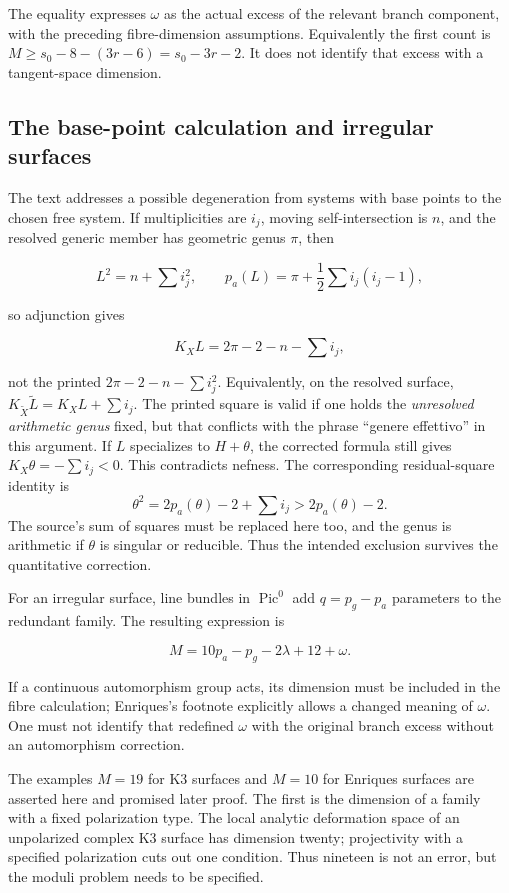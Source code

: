 The equality expresses \(\omega\) as the actual excess of the relevant branch component, with the preceding fibre-dimension assumptions. Equivalently the first count is \(M\ge s_0-8-(3r-6)=s_0-3r-2\). It does not identify that excess with a tangent-space dimension.

\subsection{The base-point calculation and irregular surfaces}

The text addresses a possible degeneration from systems with base points to the chosen free system. If multiplicities are \(i_j\), moving self-intersection is \(n\), and the resolved generic member has geometric genus \(\pi\), then

\[
L^2=n+\sum i_j^2,\qquad
p_a(L)=\pi+\frac12\sum i_j(i_j-1),
\]

so adjunction gives

\[
K_X L=2\pi-2-n-\sum i_j,
\]

not the printed \(2\pi-2-n-\sum i_j^2\). Equivalently, on the resolved surface, \(K_{\widetilde X}\widetilde L=K_X L+\sum i_j\). The printed square is valid if one holds the \emph{unresolved arithmetic genus} fixed, but that conflicts with the phrase ``genere effettivo'' in this argument. If \(L\) specializes to \(H+\theta\), the corrected formula still gives \(K_X\theta=-\sum i_j<0\). This contradicts nefness. The corresponding residual-square identity is \[
\theta^2=2p_a(\theta)-2+\sum i_j>2p_a(\theta)-2.
\] The source's sum of squares must be replaced here too, and the genus is arithmetic if \(\theta\) is singular or reducible. Thus the intended exclusion survives the quantitative correction.

For an irregular surface, line bundles in \(\operatorname{Pic}^0\) add \(q=p_g-p_a\) parameters to the redundant family. The resulting expression is

\[
M=10p_a-p_g-2\lambda+12+\omega.
\]

If a continuous automorphism group acts, its dimension must be included in the fibre calculation; Enriques's footnote explicitly allows a changed meaning of \(\omega\). One must not identify that redefined \(\omega\) with the original branch excess without an automorphism correction.

The examples \(M=19\) for K3 surfaces and \(M=10\) for Enriques surfaces are asserted here and promised later proof. The first is the dimension of a family with a fixed polarization type. The local analytic deformation space of an unpolarized complex K3 surface has dimension twenty; projectivity with a specified polarization cuts out one condition. Thus nineteen is not an error, but the moduli problem needs to be specified.

